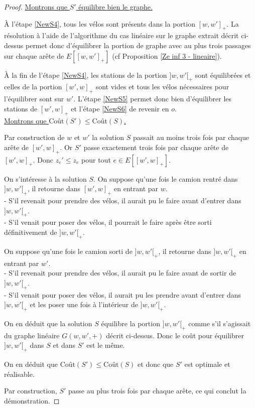 \begin{proof}
\uline{Montrons que $S'$ équilibre bien le graphe.}

\`A l'étape \ref{NewS4}, tous les vélos sont présents dans la portion $[w,w']_+$. La résolution à l'aide de l'algorithme du cas linéaire sur le graphe extrait décrit ci-dessus permet donc d'équilibrer la portion de graphe avec au plus trois passages sur chaque arête de $E\left[\left[w,w'\right]_+\right]$ (cf Proposition \ref{Ze inf 3 - lineaire}).

\`A la fin de l'étape \ref{NewS4}, les stations de la portion $]w,w'[_+$ sont équilibrées et celles de la portion $[w',w]_+$ sont vides et tous les vélos nécessaires pour l'équilibrer sont sur $w'$. L'étape \ref{NewS5} permet donc bien d'équilibrer les stations de $[w',w]_+$ et l'étape \ref{NewS6} de revenir en $o$.
\\

\uline{Montrons que $\mbox{Coût}(S') \le \mbox{Coût}(S)$.}

Par construction de $w$ et $w'$ la solution $S$ passait au moins trois fois par chaque arête de $[w',w]_+$. Or $S'$ passe exactement trois fois par chaque arête de $[w',w]_+$. Donc $z_e' \le z_e$ pour tout $e \in E\left[ \left[w',w\right]_+\right]$.

On s'intéresse à la solution $S$. On suppose qu'une fois le camion rentré dans $]w,w'[_+$, il retourne dans $[w',w]_+$ en entrant par $w$.\\
- S'il revenait pour prendre des vélos, il aurait pu le faire avant d'entrer dans $]w,w'[_+$.\\
- S'il venait pour poser des vélos, il pourrait le faire après être sorti définitivement de $]w,w'[_+$.

On suppose qu'une fois le camion sorti de $]w,w'[_+$, il retourne dans $]w,w'[_+$ en entrant par $w'$.\\
- S'il revenait pour prendre des vélos, il aurait pu le faire avant de sortir de $]w,w'[_+$.\\
- S'il venait pour poser des vélos, il aurait pu les prendre avant d'entrer dans $]w,w'[_+$ et les poser une fois à l'intérieur de $]w,w'[_+$.

On en déduit que la solution $S$ équilibre la portion $]w,w'[_+$ comme s'il s'agissait du graphe linéaire $G(w,w',+)$ décrit ci-dessus.
Donc le coût pour équilibrer $]w,w'[_+$ dans $S$ et dans $S'$ est le même.

On en déduit que $\mbox{Coût}(S') \le \mbox{Coût}(S)$ et donc que $S'$ est optimale et réalisable.

Par construction, $S'$ passe au plus trois fois par chaque arête, ce qui conclut la démonstration.
\end{proof}


